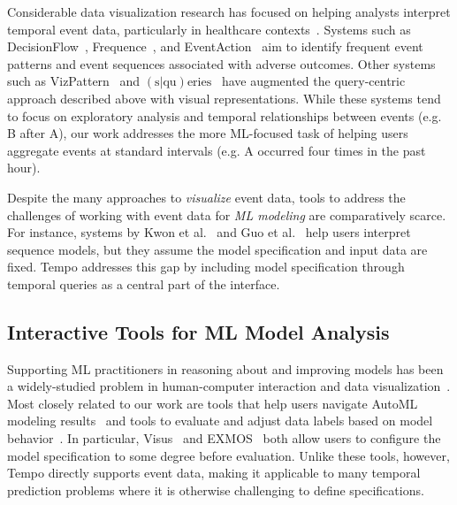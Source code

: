 Considerable data visualization research has focused on helping analysts interpret temporal event data, particularly in healthcare contexts~\cite{guo_survey_2020}.
Systems such as DecisionFlow~\cite{gotz_decisionflow_2014}, Frequence~\cite{perer_frequence_2014}, and EventAction~\cite{du_eventaction_2016} aim to identify frequent event patterns and event sequences associated with adverse outcomes. 
Other systems such as VizPattern~\cite{jin_interactive_2010} and $(\text{s}|\text{qu})\text{eries}$~\cite{zgraggen_squeries_2015} have augmented the query-centric approach described above with visual representations.
While these systems tend to focus on exploratory analysis and temporal relationships between events (e.g. B after A), our work addresses the more ML-focused task of helping users aggregate events at standard intervals (e.g. A occurred four times in the past hour).

Despite the many approaches to \textit{visualize} event data, tools to address the challenges of working with event data for \textit{ML modeling} are comparatively scarce. 
For instance, systems by Kwon et al.~\cite{kwon_retainvis_2019} and Guo et al.~\cite{guo_visualizing_2019} help users interpret sequence models, but they assume the model specification and input data are fixed. 
Tempo addresses this gap by including model specification through temporal queries as a central part of the interface.

\subsection{Interactive Tools for ML Model Analysis}
\label{sec:related-subgroups}

Supporting ML practitioners in reasoning about and improving models has been a widely-studied problem in human-computer interaction and data visualization~\cite{Hohman2019}. 
Most closely related to our work are tools that help users navigate AutoML modeling results~\cite{ono2020pipelineprofiler,santos_visus_2019} and tools to evaluate and adjust data labels based on model behavior~\cite{amershi_modeltracker_2015,bhattacharya_exmos_2024,fiebrink_human_2011}. 
In particular, Visus~\cite{santos_visus_2019} and EXMOS~\cite{bhattacharya_exmos_2024} both allow users to configure the model specification to some degree before evaluation. 
Unlike these tools, however, Tempo directly supports event data, making it applicable to many temporal prediction problems where it is otherwise challenging to define specifications.%

